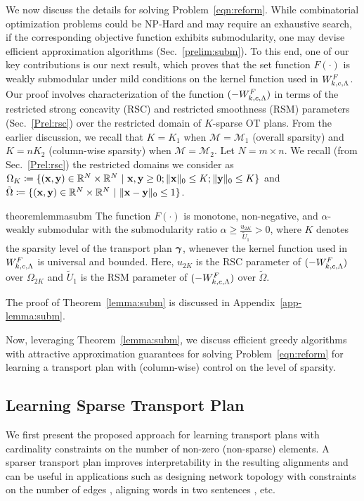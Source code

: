 We now discuss the details for solving Problem~\ref{eqn:reform}. While combinatorial optimization problems could be NP-Hard and may require an exhaustive search, if the corresponding objective function exhibits submodularity, one may devise efficient approximation algorithms (Sec.~\ref{prelim:subm}). To this end, one of our key contributions is our next result, which proves that the set function $F(\cdot)$ is weakly submodular under mild conditions on the kernel function used in $W^F_{k, c, \Lambda}$. Our proof involves characterization of the function $(-W^F_{k, c, \Lambda})$ in terms of the restricted strong concavity (RSC) and restricted smoothness (RSM) parameters (Sec.~\ref{Prel:rsc}) over the restricted domain of $K$-sparse OT plans. From the earlier discussion, we recall that $K=K_1$ when $\mathcal{M}=\mathcal{M}_1$ (overall sparsity) and $K=nK_2$ (column-wise sparsity) when $\mathcal{M}=\mathcal{M}_2$. Let $N=m\times n$. We recall (from Sec.~\ref{Prel:rsc}) the restricted domains we consider as $\Omega_K\coloneqq \{ (\mathbf{x}, \mathbf{y})\in \mathbb{R}^N\times \mathbb{R}^N~|~ \mathbf{x}, \mathbf{y} \geq 0; \|\mathbf{x}\|_0 \leq K; \|\mathbf{y}\|_0 \leq K\}$ and $\tilde{\Omega}\coloneqq \{ (\mathbf{x}, \mathbf{y})\in \mathbb{R}^N\times \mathbb{R}^N~|~ \|\mathbf{x}-\mathbf{y}\|_0\leq 1 \}$.

\begin{theoremBox}
\begin{restatable}{theorem}{lemmasubm}\label{lemma:subm}
The function $F(\cdot)$ is monotone, non-negative, and $\alpha$-weakly submodular with the submodularity ratio $\alpha\geq \frac{u_{2K}}{\tilde{U}_1}>0$, where $K$ denotes the sparsity level of the transport plan $\bm{\gamma}$, whenever the kernel function used in $W^F_{k, c, \Lambda}$ is universal \citep{SriperumbudurFL11} and bounded. Here, $u_{2K}$ is the RSC parameter of $(-W^F_{k, c, \Lambda})$ over $\Omega_{2K}$ and $\tilde{U}_1$ is the RSM parameter of $(-W^F_{k, c, \Lambda})$ over $\tilde{\Omega}$.
\end{restatable}
\end{theoremBox}
The proof of Theorem~\ref{lemma:subm} is discussed in Appendix~\ref{app-lemma:subm}. 

Now, leveraging Theorem~\ref{lemma:subm}, we discuss efficient greedy algorithms with attractive approximation guarantees for solving Problem~\ref{eqn:reform} for learning a transport plan with (column-wise) control on the level of sparsity.
\subsection{Learning Sparse Transport Plan}\label{gen-sparse}
We first present the proposed approach for learning transport plans with cardinality constraints on the number of non-zero (non-sparse) elements.
A sparser transport plan improves interpretability in the resulting alignments \citep{swanson-etal-2020-rationalizing} and can be useful in applications such as designing network topology with constraints on the number of edges \citep{ijcai2023p679}, aligning words in two sentences \citep{arase-etal-2023-unbalanced}, etc. 

